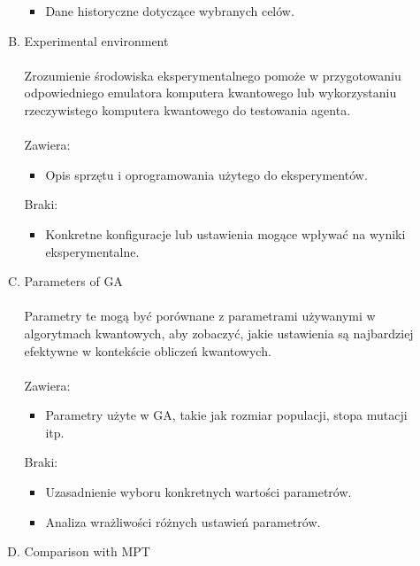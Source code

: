 \documentclass[polish,envcountsect,10pt]{article}
\begin{document}
\begin{enumerate}[I.]
\begin{enumerate}[A.]
\begin{itemize}
                  \item Dane historyczne dotyczące wybranych celów.
                \end{itemize}
          \item Experimental environment
            \\
            \\
            Zrozumienie środowiska eksperymentalnego pomoże w przygotowaniu odpowiedniego emulatora komputera kwantowego lub wykorzystaniu rzeczywistego komputera kwantowego do testowania agenta.
            \\
            \\
            Zawiera:
                \begin{itemize}
                  \item Opis sprzętu i oprogramowania użytego do eksperymentów.
                \end{itemize}
            Braki:
                \begin{itemize}
                  \item Konkretne konfiguracje lub ustawienia mogące wpływać na wyniki eksperymentalne.
                \end{itemize}
          \item Parameters of GA
            \\
            \\
            Parametry te mogą być porównane z parametrami używanymi w algorytmach kwantowych, aby zobaczyć, jakie ustawienia są najbardziej efektywne w kontekście obliczeń kwantowych.
            \\
            \\
            Zawiera:
                \begin{itemize}
                  \item Parametry użyte w GA, takie jak rozmiar populacji, stopa mutacji itp.
                \end{itemize}
            Braki:
                \begin{itemize}
                  \item Uzasadnienie wyboru konkretnych wartości parametrów.
                  \item Analiza wrażliwości różnych ustawień parametrów.
                \end{itemize}
          \item Comparison with MPT
            \\
            \\

\end{enumerate}
\end{enumerate}
\end{document}
